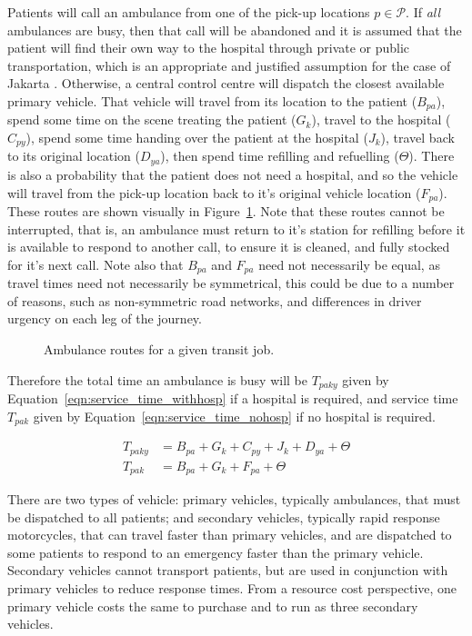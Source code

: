 \documentclass[numbers,webpdf,imaman]{ima-authoring-template}%
\begin{document}
Patients will call an ambulance from one of the pick-up locations
$p \in \mathcal{P}$. If \textit{all} ambulances are busy, then that call will be
abandoned and it is assumed that the patient will find their own way to the
hospital through private or public transportation, which is an appropriate and
justified assumption for the case of Jakarta \citep{BriceSyaribahNoor2022Esui}.
Otherwise, a central control centre will dispatch the closest available primary
vehicle. That vehicle will travel from its location to the patient ($B_{pa}$),
spend some time on the scene treating the patient ($G_k$), travel to the
hospital ($C_{py}$), spend some time handing over the patient at the hospital
($J_k$), travel back to its original location ($D_{ya}$), then spend time
refilling and refuelling ($\Theta$).
There is also a probability that the patient does not need a hospital, and so
the vehicle will travel from the pick-up location back to it's original vehicle
location ($F_{pa}$). These routes are shown visually in
Figure~\ref{fig:travel_routes}. Note that these routes cannot be interrupted,
that is, an ambulance must return to it's station for refilling before it is
available to respond to another call, to ensure it is cleaned, and fully stocked
for it's next call. Note also that $B_{pa}$ and $F_{pa}$ need not necessarily be
equal, as travel times need not necessarily be symmetrical, this could be due to
a number of reasons, such as non-symmetric road networks, and differences in
driver urgency on each leg of the journey.

\begin{figure}
    \centering
    
    \caption{Ambulance routes for a given transit job.}
    \label{fig:travel_routes}
\end{figure}

Therefore the total time an ambulance is busy will be $T_{paky}$ given by
Equation~\ref{eqn:service_time_withhosp} if a hospital is required, and
service time $T_{pak}$ given by Equation~\ref{eqn:service_time_nohosp} if no
hospital is required.

\begin{align}
T_{paky} &= B_{pa} + G_k + C_{py} + J_k + D_{ya} + \Theta \label{eqn:service_time_withhosp} \\
T_{pak} &= B_{pa} + G_k + F_{pa} + \Theta \label{eqn:service_time_nohosp}
\end{align}

There are two types of vehicle: primary vehicles, typically ambulances, that
must be dispatched to all patients; and secondary vehicles, typically rapid
response motorcycles, that can travel faster than primary vehicles, and are
dispatched to some patients to respond to an emergency faster than the primary
vehicle. Secondary vehicles cannot transport patients, but are used in
conjunction with primary vehicles to reduce response times.
From a resource cost perspective, one primary vehicle costs the same to purchase
and to run as three secondary vehicles.
\end{document}
